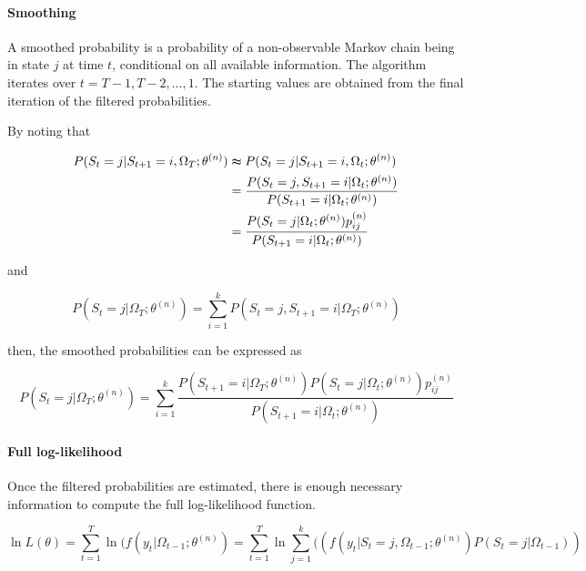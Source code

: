 \paragraph{Smoothing}

A smoothed probability is a probability of a non-observable Markov
chain being in state $j$ at time $t$, conditional on all available
information. The algorithm iterates over $t=T-1,T-2,...,1$. The starting
values are obtained from the final iteration of the filtered probabilities.

By noting that

\begin{align}
P(S_{t}=j|S_{t+1}=i,\Omega_{T};\theta^{(n)}) & \thickapprox P(S_{t}=j|S_{t+1}=i,\Omega_{t};\theta^{(n)})\nonumber \\
 & =\frac{P(S_{t}=j,S_{t+1}=i|\Omega_{t};\theta^{(n)})}{P(S_{t+1}=i|\Omega_{t};\theta^{(n)})}\nonumber \\
 & =\frac{P(S_{t}=j|\Omega_{t};\theta^{(n)})p_{ij}^{(n)}}{P(S_{t+1}=i|\Omega_{t};\theta^{(n)})}
\end{align}

and

\begin{equation}
P(S_{t}=j|\Omega_{T};\theta^{(n)})=\sum_{i=1}^{k}P(S_{t}=j,S_{t+1}=i|\Omega_{T};\theta^{(n)})
\end{equation}

then, the smoothed probabilities can be expressed as

\begin{equation}
P(S_{t}=j|\Omega_{T};\theta^{(n)})=\sum_{i=1}^{k}\frac{P(S_{t+1}=i|\Omega_{T};\theta^{(n)})P(S_{t}=j|\Omega_{t};\theta^{(n)})p_{ij}^{(n)}}{P(S_{t+1}=i|\Omega_{t};\theta^{(n)})}
\end{equation}


\paragraph{Full log-likelihood}

Once the filtered probabilities are estimated, there is enough necessary
information to compute the full log-likelihood function.

\begin{equation}
\ln L(\theta)=\sum_{t=1}^{T}\ln(f(y_{t}|\Omega_{t-1};\theta^{(n)})=\sum_{t=1}^{T}\ln\sum_{j=1}^{k}((f(y_{t}|S_{t}=j,\Omega_{t-1};\theta^{(n)})P(S_{t}=j|\Omega_{t-1}))\label{eq:loglik}
\end{equation}

